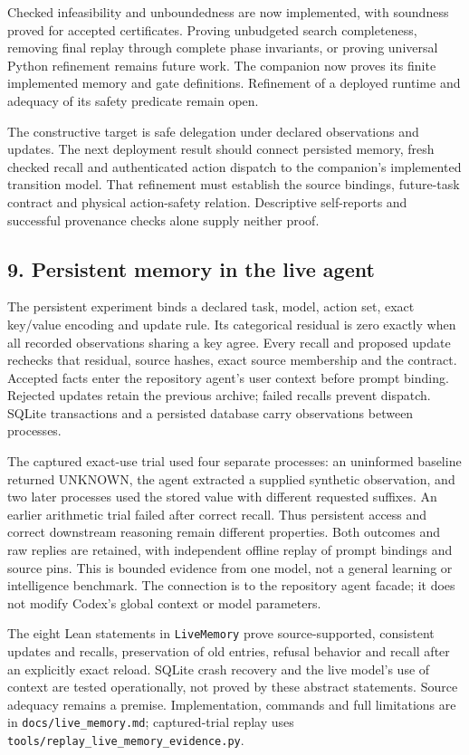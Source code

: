 \documentclass[
  10pt,
]{article}
\begin{document}
Checked infeasibility and unboundedness are now implemented, with soundness proved for accepted certificates. Proving unbudgeted search completeness, removing final replay through complete phase invariants, or proving universal Python refinement remains future work. The companion now proves its finite implemented memory and gate definitions. Refinement of a deployed runtime and adequacy of its safety predicate remain open.

The constructive target is safe delegation under declared observations and updates. The next deployment result should connect persisted memory, fresh checked recall and authenticated action dispatch to the companion's implemented transition model. That refinement must establish the source bindings, future-task contract and physical action-safety relation. Descriptive self-reports and successful provenance checks alone supply neither proof.

\subsection{9. Persistent memory in the live agent}\label{persistent-memory-in-the-live-agent}

The persistent experiment binds a declared task, model, action set, exact key/value encoding and update rule. Its categorical residual is zero exactly when all recorded observations sharing a key agree. Every recall and proposed update rechecks that residual, source hashes, exact source membership and the contract. Accepted facts enter the repository agent's user context before prompt binding. Rejected updates retain the previous archive; failed recalls prevent dispatch. SQLite transactions and a persisted database carry observations between processes.

The captured exact-use trial used four separate processes: an uninformed baseline returned UNKNOWN, the agent extracted a supplied synthetic observation, and two later processes used the stored value with different requested suffixes. An earlier arithmetic trial failed after correct recall. Thus persistent access and correct downstream reasoning remain different properties. Both outcomes and raw replies are retained, with independent offline replay of prompt bindings and source pins. This is bounded evidence from one model, not a general learning or intelligence benchmark. The connection is to the repository agent facade; it does not modify Codex's global context or model parameters.

The eight Lean statements in \texttt{LiveMemory} prove source-supported, consistent updates and recalls, preservation of old entries, refusal behavior and recall after an explicitly exact reload. SQLite crash recovery and the live model's use of context are tested operationally, not proved by these abstract statements. Source adequacy remains a premise. Implementation, commands and full limitations are in \texttt{docs/live\_memory.md}; captured-trial replay uses \texttt{tools/replay\_live\_memory\_evidence.py}.
\end{document}

